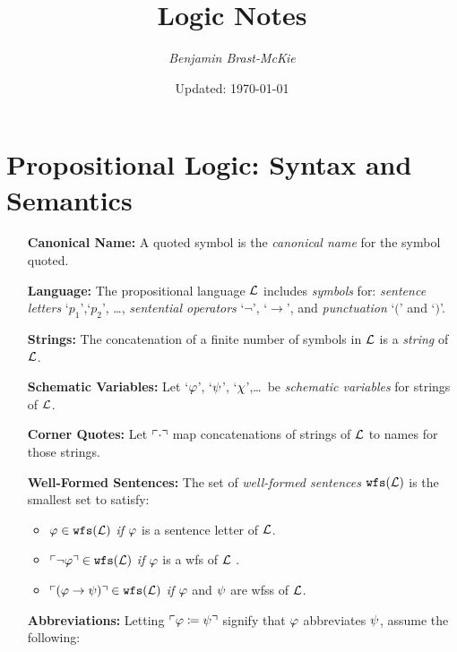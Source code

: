\documentclass[a4paper, 11pt]{article} %
\title{\textbf{Logic Notes}} %
\author{\em Benjamin Brast-McKie} %
\date{Updated: \today} %
\begin{document}
\maketitle %
\thispagestyle{empty}



\section*{\sc Propositional Logic: Syntax and Semantics}

\begin{enumerate}[leftmargin=1.2in] %
	\item[\bf Canonical Name:] A quoted symbol is the \textit{canonical name} for the symbol quoted.
	\item[\bf Language:] The propositional language $\mathcal{L}$ includes \textit{symbols} for: \textit{sentence letters} `$p_1$',`$p_2$', \dots, \textit{sentential operators} `$\neg$', `$\rightarrow$', and \textit{punctuation} `$($' and `$)$'.
	\item[\bf Strings:] The concatenation of a finite number of symbols in $\mathcal{L}$ is a \textit{string} of $\mathcal{L}$.
	\item[\bf Schematic Variables:] Let `$\varphi$', `$\psi$', `$\chi$',\ldots\ be \textit{schematic variables} for strings of $\mathcal{L}$.
	\item[\bf Corner Quotes:] Let $\ulcorner\cdot\urcorner$ map concatenations of strings of $\mathcal{L}$ to names for those strings.
	\item[\bf Well-Formed Sentences:] The set of \textit{well-formed sentences} $\texttt{wfs}(\mathcal{L})$ is the smallest set to satisfy:
	      \begin{itemize}\small
		      \item $\varphi \in \texttt{wfs}(\mathcal{L})$ \textit{if} $\varphi$ is a sentence letter of $\mathcal{L}$.
		      \item $\ulcorner\neg \varphi\urcorner \in \texttt{wfs}(\mathcal{L})$ \textit{if} $\varphi$ is a wfs of $\mathcal{L}$ .
		      \item $\ulcorner(\varphi \rightarrow \psi)\urcorner \in \texttt{wfs}(\mathcal{L})$ \textit{if} $\varphi$ and $\psi$ are wfss of $\mathcal{L}$.
	      \end{itemize}
	\item[\bf Abbreviations:] Letting $\ulcorner\varphi \coloneq \psi\urcorner$ signify that $\varphi$ abbreviates $\psi$, assume the following:

\end{enumerate}
\end{document}
